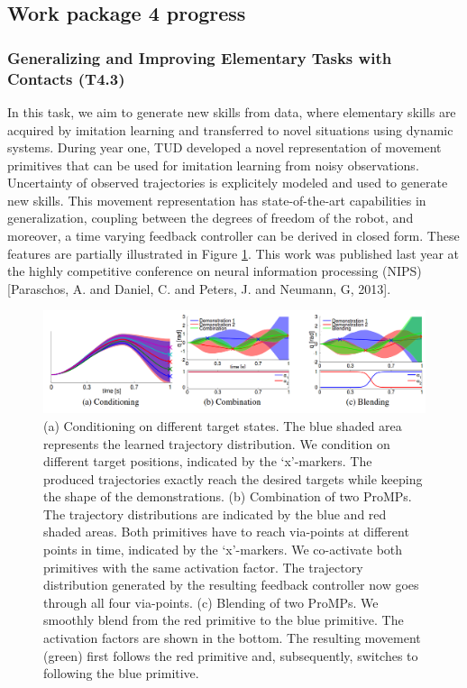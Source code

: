 \documentclass[12pt,a4paper,twoside]{article}
\begin{document}
\subsection{Work package 4 progress}

\subsubsection{Generalizing and Improving Elementary Tasks with Contacts (T4.3)}

In this task, we aim to generate new skills from data, where elementary skills 
are acquired by imitation learning and transferred to novel situations using 
dynamic systems. During year one, TUD developed a novel representation of 
movement primitives that can be used for imitation learning from noisy observations.
Uncertainty of observed trajectories is explicitely modeled and used to generate new skills.
This movement representation has state-of-the-art capabilities in generalization, 
coupling between the degrees of freedom of the robot, and moreover, 
a time varying feedback controller can be derived in closed form. 
These features are partially illustrated in Figure \ref{fig:promps}.
This work was published
last year at the highly competitive conference on neural information processing (NIPS) 
[Paraschos, A. and  Daniel, C. and  Peters, J. and Neumann, G, 2013].

\begin{figure}[!ht]
\centering
\includegraphics[width=\textwidth]{./images/ProMPs.png}
 \caption{(a)
Conditioning on different target states. The blue shaded area represents the learned
trajectory distribution. We condition on different target positions, indicated by the ‘x’-markers. The
produced trajectories exactly reach the desired targets while keeping the shape of the demonstrations.
(b)
Combination of two ProMPs. The trajectory distributions are indicated by the blue and red
shaded areas. Both primitives have to reach via-points at different points in time, indicated by
the ‘x’-markers. We co-activate both primitives with the same activation factor. The trajectory
distribution generated by the resulting feedback controller now goes through all four via-points.
(c)
Blending of two ProMPs. We smoothly blend from the red primitive to the blue primitive. The
activation factors are shown in the bottom. The resulting movement (green) first follows the red
primitive and, subsequently, switches to following the blue primitive.
}
\label{fig:promps}
\end{figure}
\end{document}
